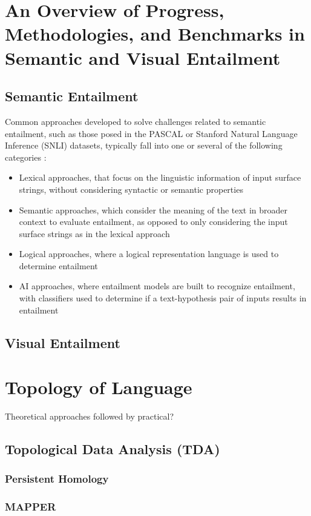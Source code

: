 \documentclass[12pt,twoside]{report}
\begin{document}
\section{An Overview of Progress, Methodologies, and Benchmarks in Semantic and Visual Entailment}

\subsection{Semantic Entailment}
Common approaches developed to solve challenges related to semantic entailment, such as those posed in the PASCAL \cite{dagan2006} or Stanford Natural Language Inference (SNLI) \cite{bowman2015} datasets, typically fall into one or several of the following categories \cite{PARAMASIVAM20229644}:
\begin{itemize}
    \item Lexical approaches, that focus on the linguistic information of input surface strings, without considering syntactic or semantic properties
    \item Semantic approaches, which consider the meaning of the text in broader context to evaluate entailment, as opposed to only considering the input surface strings as in the lexical approach
    \item Logical approaches, where a logical representation language is used to determine entailment
    \item AI approaches, where entailment models are built to recognize entailment, with classifiers used to determine if a text-hypothesis pair of inputs results in entailment 
\end{itemize}
\subsection{Visual Entailment}
\section{Topology of Language}
Theoretical approaches followed by  practical?
\subsection{Topological Data Analysis (TDA)}
\subsubsection{Persistent Homology}
\subsubsection{MAPPER}
\end{document}
